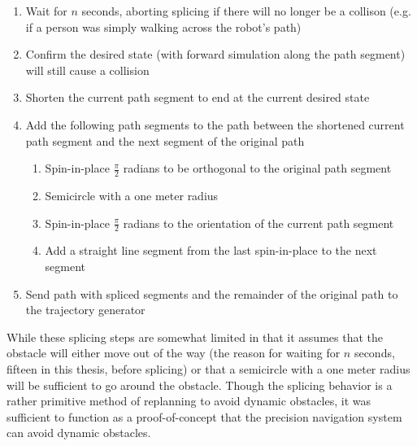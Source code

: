 \begin{enumerate}
\item Wait for $n$ seconds, aborting splicing if there will no longer be a collison (e.g. if a person was simply walking across the robot's path)
\item Confirm the desired state (with forward simulation along the path segment) will still cause a collision
\item Shorten the current path segment to end at the current desired state
\item Add the following path segments to the path between the shortened current path segment and the next segment of the original path
	\begin{enumerate}
	\item Spin-in-place $\frac{\pi}{2}$ radians to be orthogonal to the original path segment
	\item Semicircle with a one meter radius
	\item Spin-in-place $\frac{\pi}{2}$ radians to the orientation of the current path segment
	\item Add a straight line segment from the last spin-in-place to the next segment
	\end{enumerate}
\item Send path with spliced segments and the remainder of the original path to the trajectory generator
\end{enumerate}

While these splicing steps are somewhat limited in that it assumes that the obstacle will either move out of the way (the reason for waiting for $n$ seconds, fifteen in this thesis, before splicing) or that a semicircle with a one meter radius will be sufficient to go around the obstacle. Though the splicing behavior is a rather primitive method of replanning to avoid dynamic obstacles, it was sufficient to function as a proof-of-concept that the precision navigation system can avoid dynamic obstacles.

\begin{comment}

\begin{enumerate}
\item Annotated or not map?
\item Initial conditions?
\item Friendly assumptions about initial clear path?
\item How to account for dynamic obstacles that invalidate our original plan (those bastards...).
\end{enumerate}

\end{comment}

